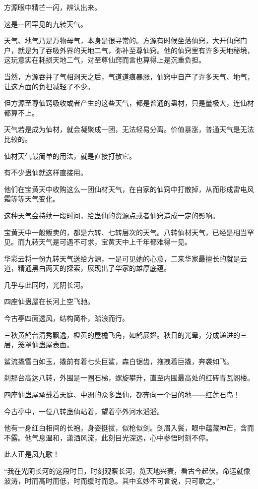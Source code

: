 \begin{this_body}
方源眼中精芒一闪，辨认出来。

这是一团罕见的九转天气。

天气、地气乃是万物母气，本身是很寻常的。方源有时候坐落仙窍，大开仙窍门户，就是为了吞吸外界的天地二气，弥补至尊仙窍。他的仙窍里有许多天地秘境，这玩意实在耗损天地二气，对至尊仙窍而言也算得上是沉重负担。

当然，方源吞并了气相洞天之后，气道道痕暴涨，仙窍中自产了许多天气、地气，让这方面的负担减轻了不少。

但方源至尊仙窍吸收或者产生的这些天气，都是普通的蛊材，只是量极大，连仙材都算不上。

天气若是成为仙材，就会凝聚成一团，无法轻易分离。价值暴涨，普通天气是无法比较的。

仙材天气最简单的用法，就是直接打散它。

有不少蛊仙就这样直接用。

他们在宝黄天中收购这么一团仙材天气，在自家的仙窍中打散掉，从而形成雷电风霜等等天气变化。

这种天气会持续一段时间，给蛊仙的资源点或者仙窍造成一定的影响。

宝黄天中一般贩卖的，都是六转、七转层次的天气。八转仙材天气，已经是相当罕见。而九转天气是可遇不可求，宝黄天中上千年都难得一见。

华彩云将一份九转天气送给方源，一是可见她的心意，二来华家最擅长的就是云道，精通黑白两天的探索，展现出了华家的雄厚底蕴。

几乎与此同时，光阴长河。

四座仙蛊屋在长河上空飞驰。

今古亭四面透风，结构简朴，踏浪而行。

三秋黄鹤台清秀飘逸，橙黄的屋檐飞角，如鹤展翅。秋日的光晕，分成递进的三层，笼罩仙蛊屋表面。

鲨流撬雪白如玉，撬前有着七头巨鲨，森白锯齿，拖拽着巨撬，奔袭如飞。

刹那台高达八转，外围是一圈石梯，螺旋攀升，直至内围最高处的红砖青瓦阁楼。

四座仙蛊屋承载着天庭、中洲的众多蛊仙，都奔向一个目的地——红莲石岛！

今古亭中，一位八转蛊仙站着，望着亭外河水滔滔。

他有一身红白相间的长袍，身姿挺拔，似枪似剑。剑眉入鬓，眼中蕴藏神芒，含而不露。他气息温和，潇洒风流，此刻目光深远，心中参悟时刻不停。

此人正是凤九歌！

“我在光阴长河的这段时日，时刻观察长河，览天地兴衰，看古今起伏。命运就像波涛，时而高时而低，时而缓时而急。其中玄妙不可言说，只可歌之。”


\end{this_body}
